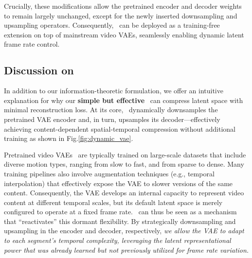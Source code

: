 Crucially, these modifications allow the pretrained encoder and decoder weights to remain largely unchanged, except for the newly inserted downsampling and upsampling operators. Consequently, \dlfr\ can be deployed as a training-free extension on top of mainstream video VAEs, seamlessly enabling dynamic latent frame rate control.

\subsection{Discussion on \dlfr}
\label{subsec:discuss}
In addition to our information-theoretic formulation, we offer an intuitive explanation for why our \textbf{simple but effective} \dlfr\ can compress latent space with minimal reconstruction loss.
At its core, \dlfr\ dynamically downsamples the pretrained VAE encoder and, in turn, upsamples its decoder—effectively achieving content-dependent spatial-temporal compression without additional training as shown in Fig.\ref{fig:dynamic_vae}.

Pretrained video VAEs~\cite{chen2024deep,xing2024large,zhu2023designing} are typically trained on large-scale datasets that include diverse motion types, ranging from slow to fast, and from sparse to dense. Many training pipelines also involve augmentation techniques (e.g., temporal interpolation) that effectively expose the VAE to slower versions of the same content. Consequently, the VAE develops an internal capacity to represent video content at different temporal scales, but its default latent space is merely configured to operate at a fixed frame rate. \dlfr~can thus be seen as a mechanism that ``reactivates'' this dormant flexibility. By strategically downsampling and upsampling in the encoder and decoder, respectively, \textit{we allow the VAE to adapt to each segment’s temporal complexity, leveraging the latent representational power that was already learned but not previously utilized for frame rate variation.}
